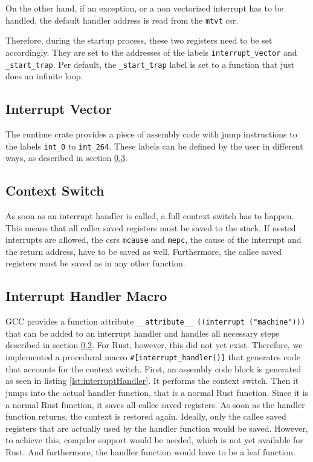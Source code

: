 On the other hand, if an exception, or a non vectorized interrupt has to be handled, the default handler address is read from the \texttt{mtvt} \gls{csr}.

Therefore, during the startup process, these two registers need to be set accordingly. They are set to the addresses of the labels \texttt{interrupt_vector} and \texttt{_start_trap}. Per default, the \texttt{_start_trap} label is set to a function that just does an infinite loop.

\subsection{Interrupt Vector}
\label{sec:vector_table}
The runtime crate provides a piece of assembly code with jump instructions to the labels \texttt{int_0} to \texttt{int_264}. These labels can be defined by the user in different ways, as described in section \ref{sec:interrupt_handler_macro}.

\subsection{Context Switch}
\label{sec:context_switch}
As soon as an interrupt handler is called, a full context switch has to happen. This means that all caller saved registers must be saved to the stack. If nested interrupts are allowed, the \gls{csr}s \texttt{mcause} and \texttt{mepc}, the cause of the interrupt and the return address, have to be saved as well. Furthermore, the callee saved registers must be saved as in any other function.

\subsection{Interrupt Handler Macro}
\label{sec:interrupt_handler_macro}
GCC provides a function attribute \texttt{__attribute__ ((interrupt ("machine")))} that can be added to an interrupt handler and handles all necessary steps described in section \ref{sec:context_switch}. For Rust, however, this did not yet exist. Therefore, we implemented a procedural macro \texttt{\#[interrupt_handler()]} that generates code that accounts for the context switch.
First, an assembly code block is generated as seen in listing \ref{lst:interruptHandler}.
It performs the context switch. Then it jumps into the actual handler function, that is a normal Rust function. Since it is a normal Rust function, it saves all callee saved registers.
As soon as the handler function returns, the context is restored again.
Ideally, only the callee saved registers that are actually used by the handler function would be saved. However, to achieve this, compiler support would be needed, which is not yet available for Rust. And furthermore, the handler function would have to be a leaf function.

